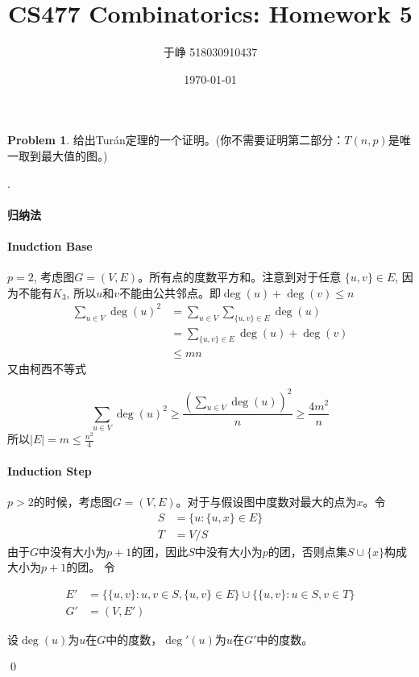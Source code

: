 \documentclass[UTF8]{ctexart}
\newenvironment{sol}
  {\par\vspace{3mm}\noindent{\it Solution}.}
  {\qed \\ \medskip}
\theoremstyle{definition}
\newtheorem{problem}{Problem}
\begin{document}
\title{CS477 Combinatorics: Homework 5}
\author{于峥 518030910437}
\date{\today}

\maketitle

\begin{problem}
给出Tur\'an定理的一个证明。(你不需要证明第二部分：$T(n,p)$是唯一取到最大值的图。)
\begin{sol}
  \paragraph{归纳法}
  \paragraph{Inudction Base}$p = 2$, 考虑图$G=(V,E)$。所有点的度数平方和。注意到对于任意
  $\{u,v\} \in E$, 因为不能有$K_3$, 所以$u$和$v$不能由公共邻点。即$\deg(u) + \deg(v) \leq n$
  \begin{align*}
      \sum_{u\in V}\deg(u)^2
      &=\sum_{u\in V}\sum_{\{u, v\} \in E} \deg(u) \\
      &=\sum_{\{ u, v \} \in E} \deg(u) + \deg(v) \\
      &\leq mn
  \end{align*}
  又由柯西不等式
  
  $$\sum_{u\in V}\deg(u)^2 \geq \frac {\left(\sum_{u\in V}\deg(u)\right)^2} n \geq \frac {4m^2} n$$
  所以$|E| = m \leq \frac {n^2} 4$

  \paragraph{Induction Step} $p>2$的时候，考虑图$G=(V,E)$。对于与假设图中度数对最大的点为$x$。令
  \begin{align*}
    S &= \{ u : \{u, x\} \in E \} \\
    T &= V / S
  \end{align*}
  由于$G$中没有大小为$p+1$的团，因此$S$中没有大小为$p$的团，否则点集$S \cup \{ x \}$构成大小为$p+1$的团。
  令
  
  \begin{align*}
    E' &= \{\{u, v\} : u, v\in S, \{u, v\} \in E\} \cup \{\{u, v\} : u \in S, v \in T\} \\
    G' &= (V, E')
  \end{align*}
  
  设$\deg(u)$为$u$在$G$中的度数，$\deg'(u)$为$u$在$G'$中的度数。
  

\end{sol}
\end{problem}
\end{document}
